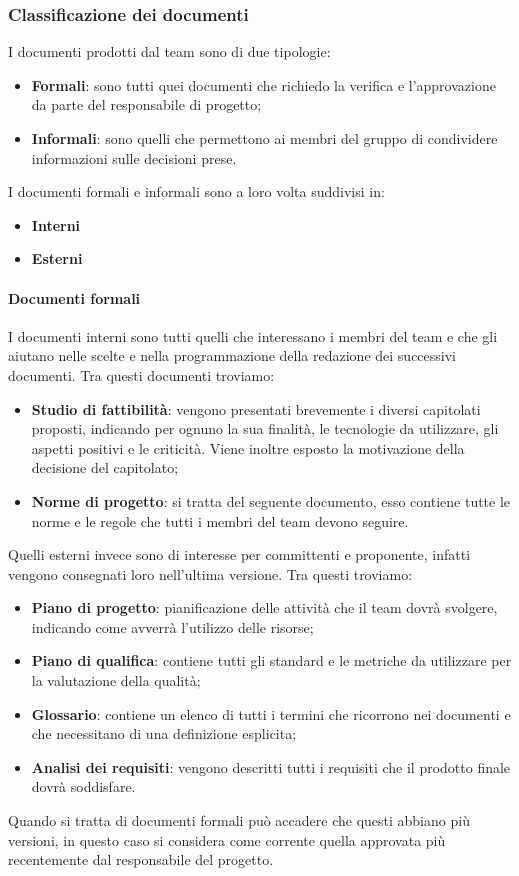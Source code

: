 \subsubsection{Classificazione dei documenti}
I documenti prodotti dal team sono di due tipologie:
\begin{itemize}
    \item \textbf{Formali}: sono tutti quei documenti che richiedo la verifica e l'approvazione da parte del responsabile di progetto;
    \item\textbf{Informali}: sono quelli che permettono ai membri del gruppo di condividere informazioni sulle decisioni prese.
\end{itemize}
I documenti formali e informali sono a loro volta suddivisi in:
\begin{itemize}
    \item\textbf{Interni}
    \item\textbf{Esterni}
\end{itemize}

\paragraph{Documenti formali}
I documenti interni sono tutti quelli che interessano i membri del team e che gli aiutano nelle scelte e nella programmazione della redazione dei successivi documenti.
Tra questi documenti troviamo:
\begin{itemize}
    \item\textbf{Studio di fattibilità}: vengono presentati brevemente i diversi capitolati proposti, indicando per ognuno la sua finalità, le tecnologie da utilizzare, gli aspetti positivi e le criticità. Viene inoltre esposto la motivazione della decisione del capitolato;
    \item\textbf{Norme di progetto}: si tratta del seguente documento, esso contiene tutte le norme e le regole che tutti i membri del team devono seguire.
\end{itemize}
Quelli esterni invece sono di interesse per committenti e proponente, infatti vengono consegnati loro nell'ultima versione.
Tra questi troviamo:
\begin{itemize}
    \item\textbf{Piano di progetto}: pianificazione delle attività che il team dovrà svolgere, indicando come avverrà l'utilizzo delle risorse;
    \item\textbf{Piano di qualifica}: contiene tutti gli standard e le metriche da utilizzare per la valutazione della qualità;
    \item\textbf{Glossario}: contiene un elenco di tutti i termini che ricorrono nei documenti e che necessitano di una definizione esplicita;
    \item\textbf{Analisi dei requisiti}: vengono descritti tutti i requisiti che il prodotto finale dovrà soddisfare.
\end{itemize}
Quando si tratta di documenti formali può accadere che questi abbiano più versioni, in questo caso si considera come corrente quella approvata più recentemente dal responsabile del progetto.

